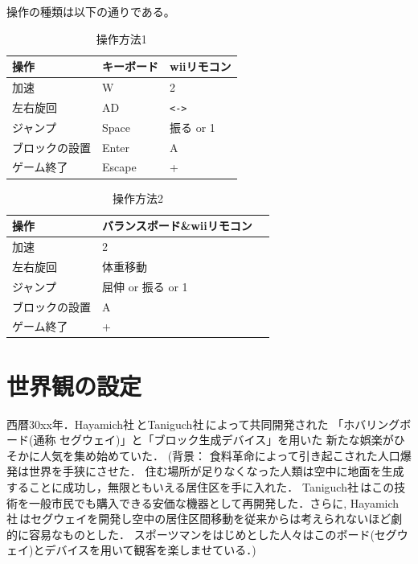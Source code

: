 \documentclass{jarticle}
\begin{document}
操作の種類は以下の通りである。
\begin{table}[h]
    \caption{操作方法1}
    \label{table:control1}
    \begin{center}
    \begin{tabular}{|l|l|l|}\hline
    操作 & キーボード & wiiリモコン\\ \hline
    加速 & W & 2 \\ \hline
    左右旋回 & AD & \verb+<->+ \\ \hline
    ジャンプ & Space & 振る or 1 \\ \hline
    ブロックの設置 & Enter & A \\ \hline
    ゲーム終了 & Escape& + \\\hline

    \end{tabular}
    \end{center}
\end{table}

\begin{table}[h]
    \caption{操作方法2}
    \label{table:control2}
    \begin{center}
    \begin{tabular}{|l|l|l|}\hline
    操作 & バランスボード\&wiiリモコン\\ \hline
    加速 & 2 \\ \hline
    左右旋回 & 体重移動 \\ \hline
    ジャンプ & 屈伸 or 振る or 1 \\ \hline
    ブロックの設置 & A \\ \hline
    ゲーム終了 & + \\\hline
    \end{tabular}
    \end{center}
\end{table}

\section{世界観の設定}
\begin{shadebox}
\label{世界観の設定}
西暦30xx年．Hayamich社\,とTaniguch社\,によって共同開発された
「ホバリングボード(通称 セグウェイ)」と「ブロック生成デバイス」を用いた
新たな娯楽がひそかに人気を集め始めていた．
(背景：
食料革命によって引き起こされた人口爆発は世界を手狭にさせた．
住む場所が足りなくなった人類は空中に地面を生成することに成功し，無限ともいえる居住区を手に入れた．
Taniguch社\,はこの技術を一般市民でも購入できる安価な機器として再開発した．さらに, Hayamich社\,はセグウェイを開発し空中の居住区間移動を従来からは考えられないほど劇的に容易なものとした．
スポーツマンをはじめとした人々はこのボード(セグウェイ)とデバイスを用いて観客を楽しませている．)
\end{shadebox}
\end{document}
